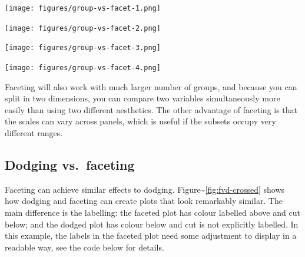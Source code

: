 \texttt{[image: figures/group-vs-facet-1.png]}

\begin{Shaded}
\begin{Highlighting}[]
\StringTok{ }\NormalTok{() +}\StringTok{ }\StringTok{ }
\end{Highlighting}
\end{Shaded}

\texttt{[image: figures/group-vs-facet-2.png]}

\begin{Shaded}
\begin{Highlighting}[]

\StringTok{ }\NormalTok{(}   
\end{Highlighting}
\end{Shaded}

\texttt{[image: figures/group-vs-facet-3.png]}

\begin{Shaded}
\begin{Highlighting}[]
\StringTok{ }\NormalTok{(}   \StringTok{ }
\StringTok{  }\StringTok{ }
\end{Highlighting}
\end{Shaded}

\texttt{[image: figures/group-vs-facet-4.png]}

Faceting will also work with much larger number of groups, and because
you can split in two dimensions, you can compare two variables
simultaneously more easily than using two different aesthetics. The
other advantage of faceting is that the scales can vary across panels,
which is useful if the subsets occupy very different ranges.

\subsection{Dodging vs.~faceting}\label{sub:dodge-vs-facet}

Faceting can achieve similar effects to dodging.
Figure\textasciitilde{}\ref{fig:fvd-crossed} shows how dodging and
faceting can create plots that look remarkably similar. The main
difference is the labelling: the faceted plot has colour labelled above
and cut below; and the dodged plot has colour below and cut is not
explicitly labelled. In this example, the labels in the faceted plot
need some adjustment to display in a readable way, see the code below
for details.  

